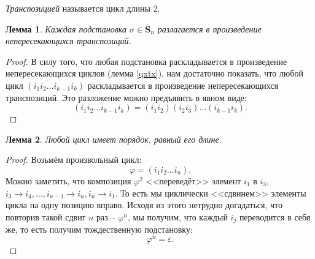 \documentclass{article}
\newtheorem{lemma}{Лемма}[section]
\begin{document}
\textit{Транспозицией} называется цикл длины 2.

\begin{lemma} \label{tf2f}
    Каждая подстановка $\sigma \in \mathbf{S}_n$ разлагается в произведение непересекающихся транспозиций.
\end{lemma}
\begin{proof}
    В силу того, что любая подстановка раскладывается в произведение непересекающихся циклов (лемма \ref{qxtx}), нам достаточно показать, что любой цикл $(i_1 i_2 \ldots i_{k - 1} i_k)$ раскладывается в произведение непересекающихся транспозиций. Это разложение можно предъявить в явном виде: $$ (i_1 i_2 \ldots i_{k - 1} i_k) = (i_1 i_2)(i_2 i_3) \ldots (i_{k - 1} i_k). $$
\end{proof}

\begin{lemma}
    Любой цикл имеет порядок, равный его длине.
\end{lemma}
\begin{proof}
    Возьмём произвольный цикл: $$ \varphi = (i_1 i_2 \ldots i_n). $$ Можно заметить, что композиция $\varphi^2$ <<переведёт>> элемент $i_1$ в $i_3$, $i_3 \rightarrow i_4, \ldots, i_{n - 1} \rightarrow i_n, i_n \rightarrow i_1 $. То есть мы циклически <<сдвинем>> элементы цикла на одну позицию вправо.
    Исходя из этого нетрудно догадаться, что повторив такой сдвиг $n$ раз -- $\varphi^n$, мы получим, что каждый $i_j $ переводится в себя же, то есть получим тождественную подстановку: $$ \varphi^n = \varepsilon. $$
\end{proof}
\end{document}
